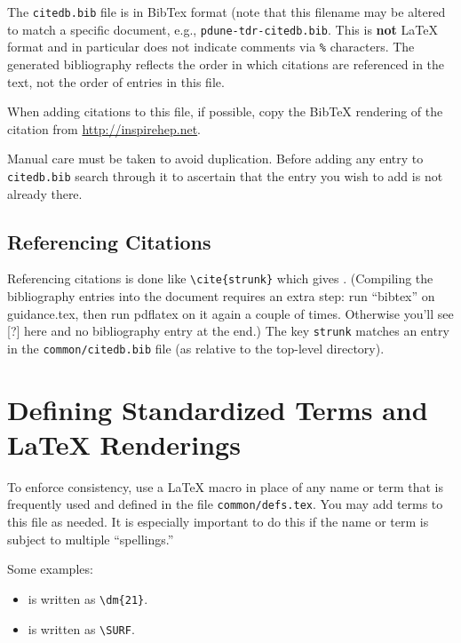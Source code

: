 The \texttt{citedb.bib} file is in BibTex format  (note that this filename may be altered to match a specific document, e.g., \texttt{pdune-tdr-citedb.bib}.
This is \textbf{not} \LaTeX{} format and in particular does not
indicate comments via \texttt{\%} characters.
The
generated bibliography reflects the order in which citations are referenced in the text, not the order of entries in this file.

When adding citations to this file, if possible, copy the BibTeX rendering of the citation from \url{http://inspirehep.net}.

Manual care must be taken to avoid duplication.
Before adding any entry to \texttt{citedb.bib} search through it
to ascertain that the entry you wish to add is not already there.

\subsection{Referencing Citations}

Referencing citations is done like \verb|\cite{strunk}| which gives \cite{strunk}.
(Compiling the bibliography entries into the document requires an extra step: run ``bibtex'' on
 guidance.tex, then run pdflatex on it again a couple of times. Otherwise you'll see [?] here 
 and no bibliography entry at the end.) 
The key \texttt{strunk} matches an entry in the \texttt{common/citedb.bib}
file (as relative to the top-level directory).

\section{Defining Standardized Terms and \LaTeX{} Renderings}

To enforce consistency, use a \LaTeX{} macro in place of any name or
term that is frequently used and defined in the file \texttt{common/defs.tex}.  You may add terms
to this file as needed. 
It is especially important to do this if the name or term is subject
to multiple ``spellings.''

Some examples:

\begin{itemize}
\item {} is written as \verb|\dm{21}|.
\item \SURF is written as \verb|\SURF|.
\end{itemize}

